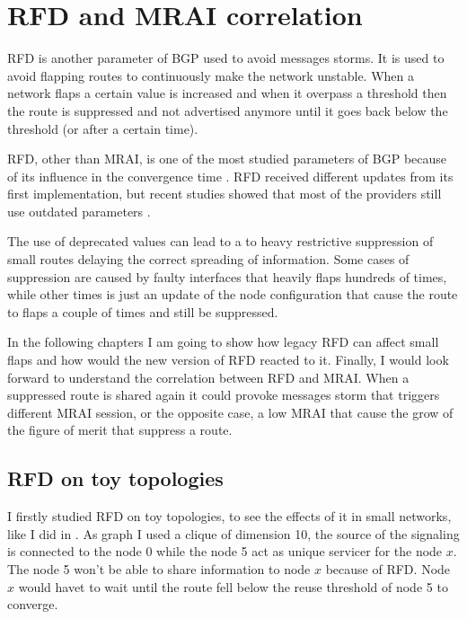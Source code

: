 \chapter{RFD and MRAI correlation}
\label{cha:bgp_rfd}


\ac{RFD} is another parameter of \ac{BGP} used to avoid messages storms.
It is used to avoid flapping routes to continuously make the network unstable.
When a network flaps a certain value is increased and when it overpass a threshold
then the route is suppressed and not advertised anymore until it goes back
below the threshold (or after a certain time).

\ac{RFD}, other than \ac{MRAI}, is one of the most studied parameters of \ac{BGP}
because of its influence in the convergence time \cite{mao2002route,pelsser2011route}.
\ac{RFD} received different updates from its first implementation, but recent 
studies showed that most of the providers still use outdated parameters  \cite{gray2020bgp}.

The use of deprecated values can lead to a to heavy restrictive suppression
of small routes delaying the correct spreading of information.
Some cases of suppression are caused by faulty interfaces that heavily flaps hundreds of times, 
while other times is just an update of the node configuration that
cause the route to flaps a couple of times and still be suppressed.

In the following chapters I am going to show how legacy \ac{RFD} can affect 
small flaps and how would the new version of \ac{RFD} reacted to it.
Finally, I would look forward to understand the correlation between \ac{RFD}
and \ac{MRAI}.
When a suppressed route is shared again it could provoke messages storm that
triggers different \ac{MRAI} session, or the opposite case, a low \ac{MRAI} that
cause the grow of the figure of merit that suppress a route.

\section{RFD on toy topologies}
\label{sec:bgp_rfd_toy}

I firstly studied \ac{RFD} on toy topologies, to see the effects of it in small 
networks, like I did in .
As graph I used a clique of dimension \num{10}, the source of the signaling
is connected to the node \num{0} while the node \num{5} act as unique servicer
for the node $x$.
The node \num{5} won't be able to share information to node $x$ because of \ac{RFD}.
Node $x$ would havet to wait until the route fell below the reuse threshold of 
node \num{5} to converge.

